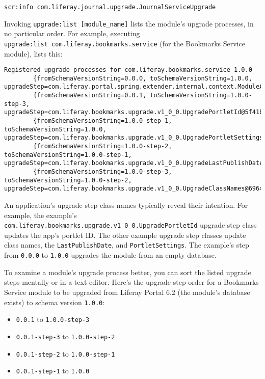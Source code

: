 \begin{verbatim}
scr:info com.liferay.journal.upgrade.JournalServiceUpgrade
\end{verbatim}

Invoking \texttt{upgrade:list\ {[}module\_name{]}} lists the module's
upgrade processes, in no particular order. For example, executing
\texttt{upgrade:list\ com.liferay.bookmarks.service} (for the Bookmarks
Service module), lists this:

\begin{verbatim}
Registered upgrade processes for com.liferay.bookmarks.service 1.0.0
        {fromSchemaVersionString=0.0.0, toSchemaVersionString=1.0.0, upgradeStep=com.liferay.portal.spring.extender.internal.context.ModuleApplicationContextExtender$ModuleApplicationContextExtension$1@6e9691da}
        {fromSchemaVersionString=0.0.1, toSchemaVersionString=1.0.0-step-3, upgradeStep=com.liferay.bookmarks.upgrade.v1_0_0.UpgradePortletId@5f41b7ee}
        {fromSchemaVersionString=1.0.0-step-1, toSchemaVersionString=1.0.0, upgradeStep=com.liferay.bookmarks.upgrade.v1_0_0.UpgradePortletSettings@53929b1d}
        {fromSchemaVersionString=1.0.0-step-2, toSchemaVersionString=1.0.0-step-1, upgradeStep=com.liferay.bookmarks.upgrade.v1_0_0.UpgradeLastPublishDate@3e05b7c8}
        {fromSchemaVersionString=1.0.0-step-3, toSchemaVersionString=1.0.0-step-2, upgradeStep=com.liferay.bookmarks.upgrade.v1_0_0.UpgradeClassNames@6964cb47}
\end{verbatim}

An application's upgrade step class names typically reveal their
intention. For example, the example's
\texttt{com.liferay.bookmarks.upgrade.v1\_0\_0.UpgradePortletId} upgrade
step class updates the app's portlet ID. The other example upgrade step
classes update class names, the \texttt{LastPublishDate}, and
\texttt{PortletSettings}. The example's step from \texttt{0.0.0} to
\texttt{1.0.0} upgrades the module from an empty database.

To examine a module's upgrade process better, you can sort the listed
upgrade steps mentally or in a text editor. Here's the upgrade step
order for a Bookmarks Service module to be upgraded from Liferay Portal
6.2 (the module's database exists) to schema version \texttt{1.0.0}:

\begin{itemize}
\tightlist
\item
  \texttt{0.0.1} to \texttt{1.0.0-step-3}
\item
  \texttt{0.0.1-step-3} to \texttt{1.0.0-step-2}
\item
  \texttt{0.0.1-step-2} to \texttt{1.0.0-step-1}
\item
  \texttt{0.0.1-step-1} to \texttt{1.0.0}
\end{itemize}


